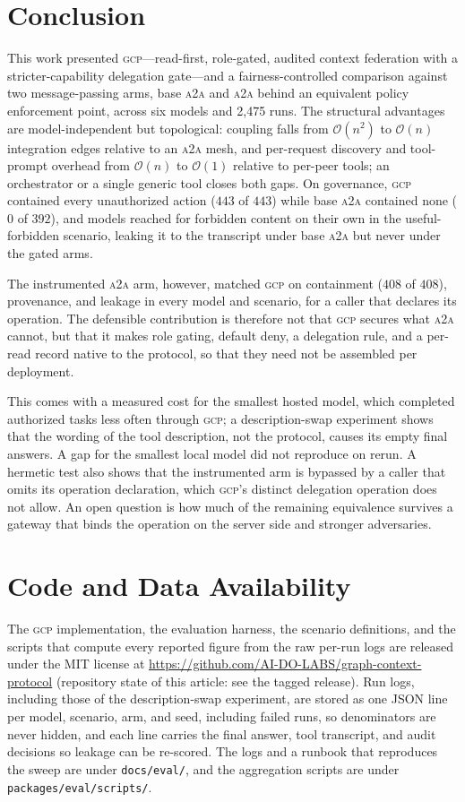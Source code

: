 \documentclass[conference,letterpaper]{IEEEtran}
\newcommand{\gcp}{\textsc{gcp}}
\newcommand{\ata}{\textsc{a2a}}
\newcommand{\bigoh}{\mathcal{O}}
\begin{document}
\section{Conclusion}
This work presented \gcp{}---read-first, role-gated, audited context federation with a
stricter-capability delegation gate---and a fairness-controlled comparison against two message-passing
arms, base \ata{} and \ata{} behind an equivalent policy enforcement point, across six models and
2{,}475 runs. The structural advantages are model-independent but topological: coupling falls from
$\bigoh(n^2)$ to $\bigoh(n)$ integration edges relative to an \ata{} mesh, and per-request discovery and
tool-prompt overhead from $\bigoh(n)$ to $\bigoh(1)$ relative to per-peer tools; an orchestrator or a
single generic tool closes both gaps. On governance, \gcp{} contained every unauthorized action ($443$ of
$443$) while base \ata{} contained none ($0$ of $392$), and models reached for forbidden content on their
own in the useful-forbidden scenario, leaking it to the transcript under base \ata{} but never under
the gated arms.

The instrumented \ata{} arm, however, matched \gcp{} on containment ($408$ of $408$),
provenance, and leakage in every model and scenario, for a caller that declares its operation. The defensible
contribution is therefore not that \gcp{} secures what \ata{} cannot, but that it makes role gating, default deny, a delegation
rule, and a per-read record native to the protocol, so that they need not be assembled per
deployment.

This comes with a measured cost for the smallest hosted model, which completed authorized tasks
less often through \gcp{}; a description-swap experiment shows that the wording of the tool
description, not the protocol, causes its empty final answers. A gap for the smallest local model did
not reproduce on rerun. A hermetic test also shows that the
instrumented arm is bypassed by a caller that omits its operation declaration, which \gcp{}'s distinct
delegation operation does not allow. An open question is how much of the remaining equivalence
survives a gateway that binds the operation on the server side and stronger adversaries.

\section*{Code and Data Availability}
\label{sec:availability}
The \gcp{} implementation, the evaluation harness, the scenario definitions, and the scripts that compute every reported figure from the raw per-run logs are released under the MIT license at
\url{https://github.com/AI-DO-LABS/graph-context-protocol} (repository state of this article: see the
tagged release). Run logs, including those of the description-swap experiment, are stored as one JSON line per model, scenario, arm, and seed, including
failed runs, so denominators are never hidden, and each line carries the final answer, tool
transcript, and audit decisions so leakage can be re-scored. The logs and a runbook that reproduces the sweep are under \texttt{docs/eval/}, and the aggregation scripts are under \texttt{packages/eval/scripts/}.
\end{document}

